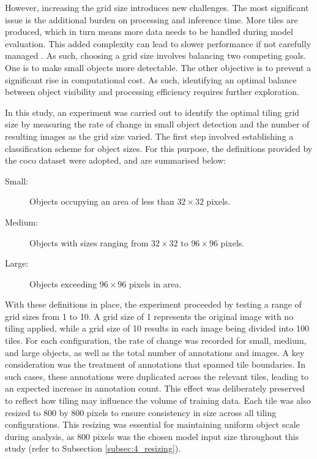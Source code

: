 However, increasing the grid size introduces new challenges. The most significant issue is the additional burden on processing and inference time. More tiles are produced, which in turn means more data needs to be handled during model evaluation. This added complexity can lead to slower performance if not carefully managed \cite{tiling}.
As such, choosing a grid size involves balancing two competing goals. One is to make small objects more detectable. The other objective is to prevent a significant rise in computational cost. As such, identifying an optimal balance between object visibility and processing efficiency requires further exploration.

In this study, an experiment was carried out to identify the optimal tiling grid size by measuring the rate of change in small object detection and the number of resulting images as the grid size varied. The first step involved establishing a classification scheme for object sizes. For this purpose, the definitions provided by the \gls{coco} dataset \cite{coco} were adopted, and are summarised below:

\begin{adjustwidth}{4em}{0pt} %
\begin{description}
    \item[Small:] Objects occupying an area of less than $32 \times 32$ pixels.
    \item[Medium:] Objects with sizes ranging from $32 \times 32$ to $96 \times 96$ pixels.
    \item[Large:] Objects exceeding $96 \times 96$ pixels in area.
\end{description}
\end{adjustwidth}

With these definitions in place, the experiment proceeded by testing a range of grid sizes from 1 to 10. A grid size of 1 represents the original image with no tiling applied, while a grid size of 10 results in each image being divided into 100 tiles. For each configuration, the rate of change was recorded for small, medium, and large objects, as well as the total number of annotations and images.
A key consideration was the treatment of annotations that spanned tile boundaries. In such cases, these annotations were duplicated across the relevant tiles, leading to an expected increase in annotation count. This effect was deliberately preserved to reflect how tiling may influence the volume of training data. Each tile was also resized to 800 by 800 pixels to ensure consistency in size across all tiling configurations. This resizing was essential for maintaining uniform object scale during analysis, as 800 pixels was the chosen model input size throughout this study (refer to Subsection \ref{subsec:4_resizing}).

